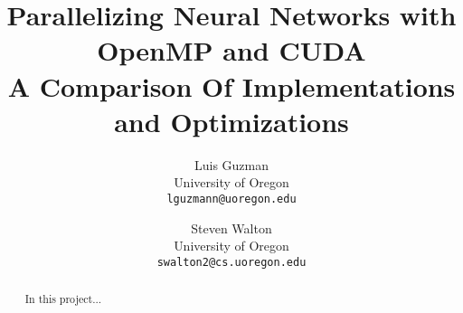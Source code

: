 \documentclass[final]{cvpr}
\begin{document}
\title{Parallelizing Neural Networks with OpenMP and CUDA\\
\small{A Comparison Of Implementations and Optimizations}}

\author{Luis Guzman \\
University of Oregon\\
{\tt\small lguzmann@uoregon.edu}
\and
Steven Walton\\
University of Oregon\\

{\tt\small swalton2@cs.uoregon.edu}
}

\maketitle


\begin{abstract}
In this project...
\end{abstract}






{\small

%

}
\end{document}
